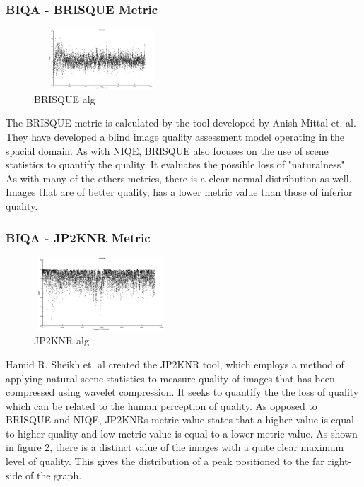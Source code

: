 \vspace{-5mm}
\subsubsection{BIQA - BRISQUE Metric}\vspace{-5mm}
	\begin{figure}
		\centering
		\includegraphics[height=2.25cm, width=5cm]{pics/biqa_dist_brisque}
		\caption{BRISQUE alg \cite{brisque}}
		\label{fig:brisque}
	\end{figure}
The BRISQUE metric is calculated by the tool developed by Anish Mittal et.
al\cite{brisque}. They have developed a blind image quality assessment model
operating in the spacial domain.  As with NIQE, BRISQUE also focuses on the use
of scene statistics to quantify the quality.  It evaluates the possible loss of
"naturalness".
As with many of the others metrics, there is a clear normal distribution as
well. Images that are of better quality, has a lower metric value than those of
inferior quality.


\vspace{-5mm}
\subsubsection{BIQA - JP2KNR Metric}\vspace{-5mm}
	\begin{figure}
		\centering
		\includegraphics[height=2.75cm, width=5cm]{pics/biqa_dist_jp2knr}
		\caption{JP2KNR alg \cite{jp2knr}}
		\label{fig:jp2knr}
	\end{figure}
Hamid R. Sheikh et. al created the JP2KNR tool, which employs a method of
applying natural scene statistics to measure quality of images that has been
compressed using wavelet compression.  It seeks to quantify the the loss of
quality which can be related to the human perception of quality.
As opposed to BRISQUE and NIQE, JP2KNRs metric value states that a higher value
is equal to higher quality and low metric value is equal to a lower metric
value.
As shown in figure \ref{fig:jp2knr}, there is a distinct value of the images
with a quite clear maximum level of quality.  This gives the distribution of a
peak positioned to the far right-side of the graph.


